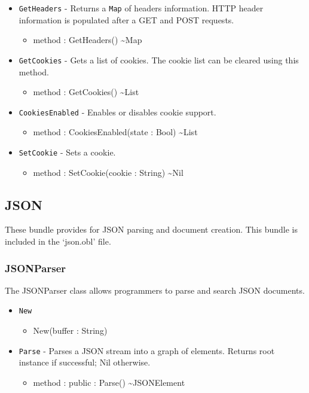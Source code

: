 \documentclass[11pt]{article}
\begin{document}
\begin{itemize}
\item \texttt{GetHeaders} - Returns a \texttt{Map} of headers
  information.  HTTP header information is populated after a GET and
  POST requests.
  \begin{itemize}
  \item method : GetHeaders() \textasciitilde Map
  \end{itemize}
\item \texttt{GetCookies} - Gets a list of cookies.  The cookie list
  can be cleared using this method.
  \begin{itemize}
  \item method : GetCookies() \textasciitilde List
  \end{itemize}
\item \texttt{CookiesEnabled} - Enables or disables cookie support.
  \begin{itemize}
  \item method : CookiesEnabled(state : Bool) \textasciitilde List
  \end{itemize}
\item \texttt{SetCookie} - Sets a cookie.
  \begin{itemize}
  \item method : SetCookie(cookie : String) \textasciitilde Nil
  \end{itemize}
\end{itemize}

\subsection{JSON}
These bundle provides for JSON parsing and document creation.  This bundle is included in the `json.obl' file.

\subsubsection{JSONParser}
The JSONParser class allows programmers to parse and search JSON
documents.
\begin{itemize}
\item \texttt{New}
  \begin{itemize}
  \item New(buffer : String)
  \end{itemize}
\item \texttt{Parse} - Parses a JSON stream into a graph of elements.
  Returns root instance if successful; Nil otherwise.
  \begin{itemize}
  \item method : public : Parse() \textasciitilde JSONElement
  \end{itemize}
\end{itemize}
\end{document}
